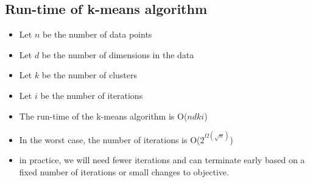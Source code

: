 \documentclass[10pt]{article}
\begin{document}
\subsection*{Run-time of k-means algorithm}
\begin{itemize}
    \item Let $n$ be the number of data points
    \item Let $d$ be the number of dimensions in the data
    \item Let $k$ be the number of clusters
    \item Let $i$ be the number of iterations
    \item The run-time of the k-means algorithm is O($ndki$)
    \item In the worst case, the number of iterations is O($2^{\Omega(\sqrt{n})}$)
    \item in practice, we will need fewer iterations and can terminate early based on a fixed number of iterations or small changes to objective.
\end{itemize}
\end{document}
